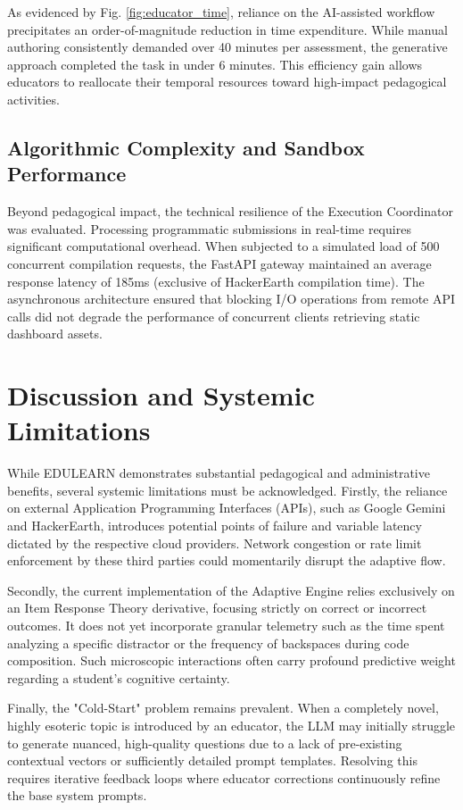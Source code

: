 \documentclass[conference]{IEEEtran}
\begin{document}
As evidenced by Fig. \ref{fig:educator_time}, reliance on the AI-assisted workflow precipitates an order-of-magnitude reduction in time expenditure. While manual authoring consistently demanded over 40 minutes per assessment, the generative approach completed the task in under 6 minutes. This efficiency gain allows educators to reallocate their temporal resources toward high-impact pedagogical activities.

\subsection{Algorithmic Complexity and Sandbox Performance}
Beyond pedagogical impact, the technical resilience of the Execution Coordinator was evaluated. Processing programmatic submissions in real-time requires significant computational overhead. When subjected to a simulated load of 500 concurrent compilation requests, the FastAPI gateway maintained an average response latency of 185ms (exclusive of HackerEarth compilation time). The asynchronous architecture ensured that blocking I/O operations from remote API calls did not degrade the performance of concurrent clients retrieving static dashboard assets.

\section{Discussion and Systemic Limitations}
While EDULEARN demonstrates substantial pedagogical and administrative benefits, several systemic limitations must be acknowledged. Firstly, the reliance on external Application Programming Interfaces (APIs), such as Google Gemini and HackerEarth, introduces potential points of failure and variable latency dictated by the respective cloud providers. Network congestion or rate limit enforcement by these third parties could momentarily disrupt the adaptive flow.

Secondly, the current implementation of the Adaptive Engine relies exclusively on an Item Response Theory derivative, focusing strictly on correct or incorrect outcomes. It does not yet incorporate granular telemetry such as the time spent analyzing a specific distractor or the frequency of backspaces during code composition. Such microscopic interactions often carry profound predictive weight regarding a student's cognitive certainty.

Finally, the "Cold-Start" problem remains prevalent. When a completely novel, highly esoteric topic is introduced by an educator, the LLM may initially struggle to generate nuanced, high-quality questions due to a lack of pre-existing contextual vectors or sufficiently detailed prompt templates. Resolving this requires iterative feedback loops where educator corrections continuously refine the base system prompts.
\end{document}
